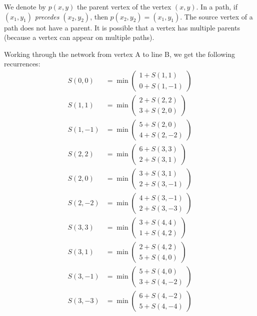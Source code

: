 \documentclass[english,notitlepage,smartquotes]{hgbreport}
\theoremstyle{definition}
\theoremstyle{definition}
\theoremstyle{remark}
\theoremstyle{definition}
\theoremstyle{plain}
\theoremstyle{definition}
\begin{document}
We denote by $p(x,y)$ the parent vertex of the vertex $(x,y)$. In a path, if $(x_1,y_1)$ \emph{precedes} $(x_2,y_2)$, then $p(x_2,y_2)=(x_1,y_1)$. The source vertex of a path does not have a parent. It is possible that a vertex has multiple parents (because a vertex can appear on multiple paths).

Working through the network from vertex A to line B, we get the following recurrences:
\begingroup
\allowdisplaybreaks
\begin{equation}
\begin{aligned}
S(0,0) &=\min
  \begin{pmatrix}
  1+S(1,1) \\
  0+S(1,-1)
  \end{pmatrix}\\
S(1,1) &=\min
  \begin{pmatrix}
  2+S(2,2) \\
  3+S(2,0)
  \end{pmatrix}\\
S(1,-1) &=\min
  \begin{pmatrix}
  5+S(2,0) \\
  4+S(2,-2)
  \end{pmatrix}\\
S(2,2) &=\min
  \begin{pmatrix}
  6+S(3,3) \\
  2+S(3,1)
  \end{pmatrix}\\
S(2,0) &=\min
  \begin{pmatrix}
  3+S(3,1)\\
  2+S(3,-1)
  \end{pmatrix}\\
S(2,-2) &=\min
  \begin{pmatrix}
  4+S(3,-1)\\
  2+S(3,-3)
  \end{pmatrix}\\
S(3,3) &=\min
  \begin{pmatrix}
  3+S(4,4)\\
  1+S(4,2)
  \end{pmatrix}\\
S(3,1) &=\min
  \begin{pmatrix}
  2+S(4,2)\\
  5+S(4,0)
  \end{pmatrix}\\
S(3,-1) &=\min
  \begin{pmatrix}
  5+S(4,0)\\
  3+S(4,-2)
  \end{pmatrix}\\
S(3,-3) &=\min
  \begin{pmatrix}
  6+S(4,-2)\\
  5+S(4,-4)
  \end{pmatrix}\\
\end{aligned}
\label{eq:p11rr}
\end{equation}
\endgroup
\end{document}
